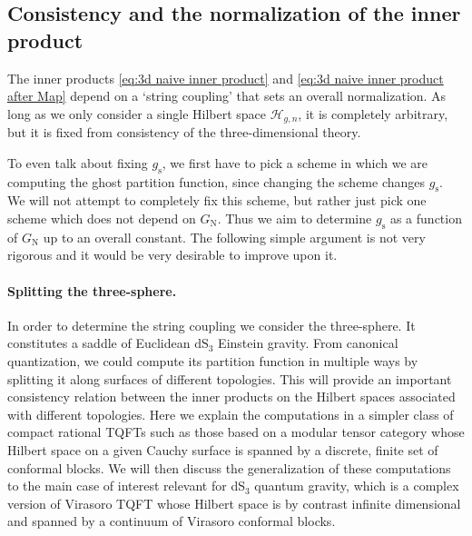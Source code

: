 \documentclass[12pt,a4paper]{article}
\begin{document}
\subsection{Consistency and the normalization of the inner product} \label{subsec:3d consistency}

The inner products \eqref{eq:3d naive inner product} and \eqref{eq:3d naive inner product after Map} depend on a `string coupling' that sets an overall normalization. As long as we only consider a single Hilbert space $\mathcal{H}_{g,n}$, it is completely arbitrary, but it is fixed from consistency of the three-dimensional theory.

To even talk about fixing $g_\text{s}$, we first have to pick a scheme in which we are computing the ghost partition function, since changing the scheme changes $g_\text{s}$. We will not attempt to completely fix this scheme, but rather just pick one scheme which does not depend on $G_\text{N}$. Thus we aim to determine $g_\text{s}$ as a function of $G_\text{N}$ up to an overall constant. The following simple argument is not very rigorous and it would be very desirable to improve upon it.

\paragraph{Splitting the three-sphere.} In order to determine the string coupling we consider the three-sphere. It constitutes a saddle of Euclidean $\mathrm{dS}_3$ Einstein gravity. From canonical quantization, we could compute its partition function in multiple ways by splitting it along surfaces of different topologies. This will provide an important consistency relation between the inner products on the Hilbert spaces associated with different topologies. Here we explain the computations in a simpler class of compact rational TQFTs such as those based on a modular tensor category whose Hilbert space on a given Cauchy surface is spanned by a discrete, finite set of conformal blocks. We will then discuss the generalization of these computations to the main case of interest relevant for dS$_3$ quantum gravity, which is a complex version of Virasoro TQFT whose Hilbert space is by contrast infinite dimensional and spanned by a continuum of Virasoro conformal blocks.
\end{document}
